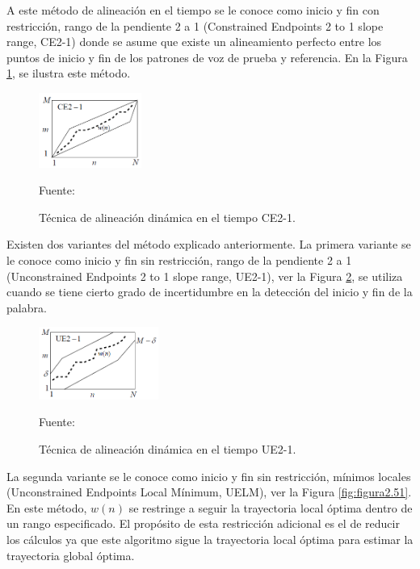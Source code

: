 \begin{enumerate}
\vskip 0.5cm
A este método de alineación en el tiempo se le conoce como inicio y fin con restricción, rango de la pendiente 2 a 1 (Constrained Endpoints 2 to 1 slope range, CE2-1) donde se asume que existe un alineamiento perfecto entre los puntos de inicio y fin de los patrones de voz de prueba y referencia. En la Figura \ref{fig:figura2.49}, se ilustra este método.
\begin{figure}[H]
\begin{center}
\includegraphics[width=0.3\textwidth]{Imagenes/Cap2/image050}
\end{center}
\begin{center}
\vskip -0.5cm
\caption{\small{Técnica de alineación dinámica en el tiempo CE2-1.}}
\label{fig:figura2.49}
{\small{Fuente: \cite{rabiner}}}
\end{center}
\end{figure}
\vskip -0.5cm
Existen dos variantes del método explicado anteriormente. La primera variante se le conoce como inicio y fin sin restricción, rango de la pendiente 2 a 1 (Unconstrained Endpoints 2 to 1 slope range, UE2-1), ver la Figura \ref{fig:figura2.50}, se utiliza cuando se tiene cierto grado de incertidumbre en la detección del inicio y fin de la palabra. 
\vskip 0.2cm
\begin{figure}[H]
\begin{center}
\includegraphics[width=0.35\textwidth]{Imagenes/Cap2/image051}
\end{center}
\begin{center}
\vskip -0.5cm
\caption{\small{Técnica de alineación dinámica en el tiempo UE2-1.}}
\label{fig:figura2.50}
{\small{Fuente: \cite{rabiner}}}
\end{center}
\end{figure}
\vskip -0.5cm
La segunda variante se le conoce como inicio y fin sin restricción, mínimos locales (Unconstrained Endpoints Local Mínimum, UELM), ver la Figura \ref{fig:figura2.51}. En este método, $w(n)$ se restringe a seguir la trayectoria local óptima dentro de un rango especificado.  El propósito de esta restricción adicional es el de reducir los cálculos ya que este algoritmo sigue la trayectoria local óptima para estimar la trayectoria global óptima.

\end{enumerate}
